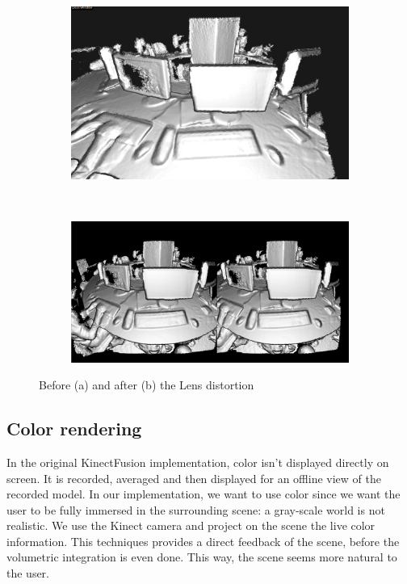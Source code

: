 \documentclass[12pt, twoside]{article}
\begin{document}
\begin{figure}[h]
        \centering
        \begin{subfigure}[t]{0.6\textwidth}
                \includegraphics[width=1\textwidth]{BefDistort.png}
                \caption{}
        \end{subfigure}~\\
        \begin{subfigure}[t]{0.6\textwidth}
                \includegraphics[width=1\textwidth]{AftDistort.png}
                \caption{}
        \end{subfigure}
        \caption{\label{fig:distortcomp}Before (a) and after (b) the Lens distortion}
        
\end{figure}

\subsection{Color rendering}
In the original KinectFusion implementation, color isn't displayed directly on screen. It is recorded, averaged and then displayed for an offline view of the recorded model. In our implementation, we want to use color since we want the user to be fully immersed in the surrounding scene: a gray-scale world is not realistic. We use the Kinect camera and project on the scene the live color information. This techniques provides a direct feedback of the scene, before the volumetric integration is even done. This way, the scene seems more natural to the user.
\end{document}
